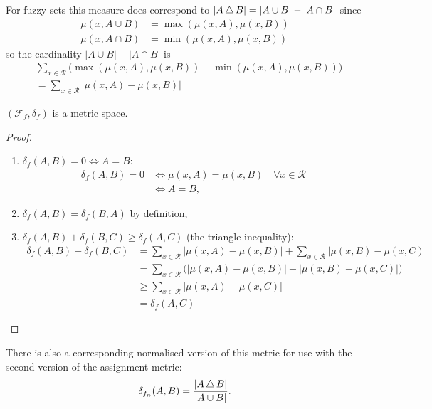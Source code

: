 For fuzzy sets this measure does correspond to $|A \operatorname{\bigtriangleup} B| = |A \cup B|
- |A \cap B|$ since
\begin{align*}
  \mu(x, A \cup B) &= \max(\mu(x,A), \mu(x,B))\\
  \mu(x, A \cap B) &= \min(\mu(x,A), \mu(x,B))
\end{align*}
so the cardinality $|A \cup B| - |A \cap B|$ is
\begin{align*}
  &\sum_{x \in \mathcal{R}} \big(\max(\mu(x,A),\mu(x,B)) - \min(\mu(x,A),\mu(x,B))\big)\\
  &= \sum_{x \in \mathcal{R}} |\mu(x,A) - \mu(x,B)|
\end{align*}

\begin{thm}
  $(\mathcal{F}_f, \delta_f)$ is a metric space.
\end{thm}

\begin{proof}~
  
  \begin{enumerate}
  \item $\delta_f(A,B) = 0 \iff A=B$:
    \begin{align*}
      \delta_f(A,B) = 0 &\iff \mu(x,A) = \mu(x,B) \quad \forall x \in
      \mathcal{R}\\
      &\iff A = B,
    \end{align*}
  \item $\delta_f(A,B) = \delta_f(B,A)$ by definition,
  \item $\delta_f(A,B)+\delta_f(B,C) \geq \delta_f(A,C)$ (the triangle
    inequality):
    \begin{align*}
      \delta_f(A,B) + \delta_f(B,C)
      &= \sum_{x \in \mathcal{R}} |\mu(x,A) - \mu(x,B)|
      + \sum_{x \in \mathcal{R}} |\mu(x,B) - \mu(x,C)|\\
      &= \sum_{x \in \mathcal{R}} \big(|\mu(x,A)-\mu(x,B)|
      + |\mu(x,B)-\mu(x,C)|\big)\\
      &\geq \sum_{x \in \mathcal{R}} |\mu(x,A) - \mu(x,C)|\\
      &= \delta_f(A,C)
    \end{align*}
  \end{enumerate}
\end{proof}

There is also a corresponding normalised version of this metric for use with
the second version of the assignment metric:
  \begin{equation*}
    \delta_{f_n}(A,B) = \frac{|A \operatorname{\bigtriangleup} B|}{|A \cup B|}.
  \end{equation*}


